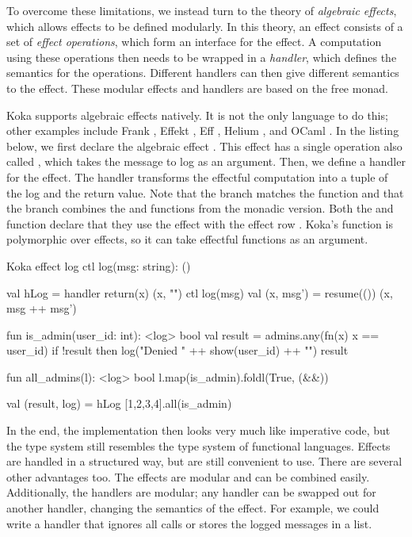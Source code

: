 To overcome these limitations, we instead turn to the theory of \emph{algebraic effects}, which allows effects to be defined modularly. In this theory, an effect consists of a set of \emph{effect operations}, which form an interface for the effect. A computation using these operations then needs to be wrapped in a \emph{handler}, which defines the semantics for the operations. Different handlers can then give different semantics to the effect. These modular effects and handlers are based on the free monad.

Koka supports algebraic effects natively. It is not the only language to do this; other examples include Frank \autocite{lindley_be_2017}, Effekt \autocite{brachthauser_effects_2020}, Eff \autocite{bauer_programming_2015}, Helium \autocite{biernacki_abstracting_2019}, and OCaml \autocite{sivaramakrishnan_retrofitting_2021}. In the listing below, we first declare the algebraic effect . This effect has a single operation also called , which takes the message to log as an argument. Then, we define a handler  for the  effect. The handler transforms the effectful computation into a tuple of the log and the return value. Note that the  branch matches the  function and that the  branch combines the  and  functions from the monadic version. Both the  and  function declare that they use the  effect with the effect row . Koka's  function is polymorphic over effects, so it can take effectful functions as an argument.

\begin{lst}{Koka}
effect log
  ctl log(msg: string): ()
  
val hLog = handler
  return(x) (x, "")
  ctl log(msg)
    val (x, msg') = resume(())
    (x, msg ++ msg')
  
fun is_admin(user_id: int): <log> bool
  val result = admins.any(fn(x) x == user_id)
  if !result then
    log("Denied " ++ show(user_id) ++ "\n")
  result
 
fun all_admins(l): <log> bool
  l.map(is_admin).foldl(True, (&&))
  
val (result, log) = hLog { [1,2,3,4].all(is_admin) }
\end{lst}
%
In the end, the implementation then looks very much like imperative code, but the type system still resembles the type system of functional languages. Effects are handled in a structured way, but are still convenient to use. There are several other advantages too. The effects are modular and can be combined easily. Additionally, the handlers are modular; any handler can be swapped out for another handler, changing the semantics of the effect. For example, we could write a handler that ignores all  calls or stores the logged messages in a list.

